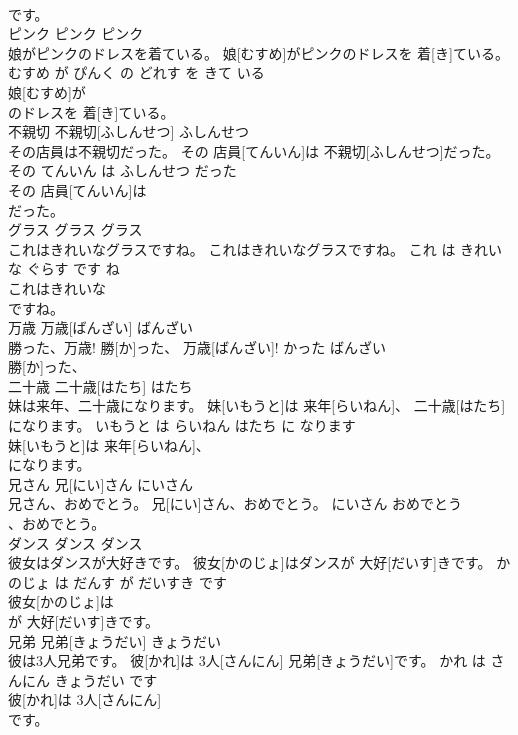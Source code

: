 \documentclass[8pt]{extreport}
\begin{document}
\begin{CJK}{UTF8}{min}
\\	です。			
\\	ピンク	ピンク	ピンク	
\\	娘がピンクのドレスを着ている。	娘[むすめ]がピンクのドレスを 着[き]ている。	むすめ が ぴんく の どれす を きて いる	
\\	娘[むすめ]が
\\	のドレスを 着[き]ている。			
\\	不親切	不親切[ふしんせつ]	ふしんせつ	
\\	その店員は不親切だった。	その 店員[てんいん]は 不親切[ふしんせつ]だった。	その てんいん は ふしんせつ だった	
\\	その 店員[てんいん]は
\\	だった。			
\\	グラス	グラス	グラス	
\\	これはきれいなグラスですね。	これはきれいなグラスですね。	これ は きれい な ぐらす です ね	
\\	これはきれいな
\\	ですね。			
\\	万歳	万歳[ばんざい]	ばんざい	
\\	勝った、万歳!	勝[か]った、 万歳[ばんざい]!	かった ばんざい	
\\	勝[か]った、
\\	二十歳	二十歳[はたち]	はたち	
\\	妹は来年、二十歳になります。	妹[いもうと]は 来年[らいねん]、 二十歳[はたち]になります。	いもうと は らいねん はたち に なります	
\\	妹[いもうと]は 来年[らいねん]、
\\	になります。			
\\	兄さん	兄[にい]さん	にいさん	
\\	兄さん、おめでとう。	兄[にい]さん、おめでとう。	にいさん おめでとう	
\\	、おめでとう。			
\\	ダンス	ダンス	ダンス	
\\	彼女はダンスが大好きです。	彼女[かのじょ]はダンスが 大好[だいす]きです。	かのじょ は だんす が だいすき です	
\\	彼女[かのじょ]は
\\	が 大好[だいす]きです。			
\\	兄弟	兄弟[きょうだい]	きょうだい	
\\	彼は3人兄弟です。	彼[かれ]は 3人[さんにん] 兄弟[きょうだい]です。	かれ は さんにん きょうだい です	
\\	彼[かれ]は 3人[さんにん]
\\	です。			

\end{CJK}
\end{document}
